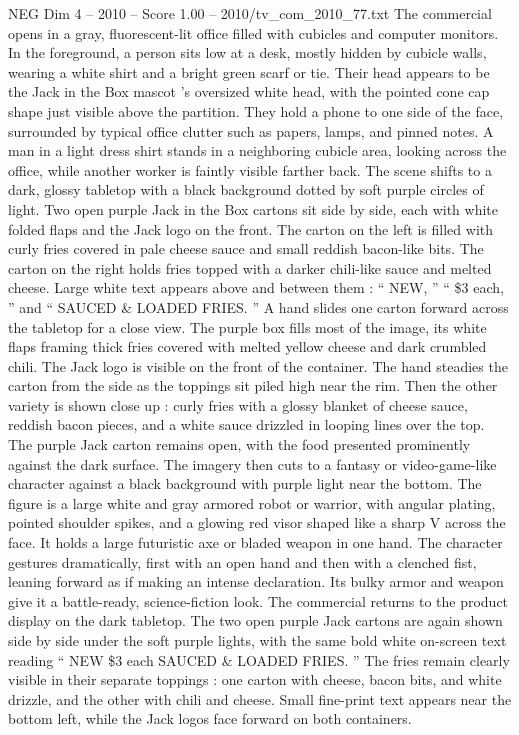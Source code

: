 \begin{textsample}{NEG Dim 4 – 2010 – Score 1.00 – 2010/tv\_com\_2010\_77.txt}  \label{ex:f4_neg_074}
The commercial opens in a gray, fluorescent-lit office filled with cubicles and computer monitors.
In the foreground, a person sits low at a desk, mostly hidden by cubicle walls, wearing a white shirt and a bright green scarf or tie.
Their head appears to be the Jack in the Box mascot ’s oversized white head, with the pointed cone cap shape just visible above the partition.
They hold a phone to one side of the face, surrounded by typical office clutter such as papers, lamps, and pinned notes.
A man in a light dress shirt stands in a neighboring cubicle area, looking across the office, while another worker is faintly visible farther back.
The scene shifts to a dark, glossy tabletop with a black background dotted by soft purple circles of light.
Two open purple Jack in the Box cartons sit side by side, each with white folded flaps and the Jack logo on the front.
The carton on the left is filled with curly fries covered in pale cheese sauce and small reddish bacon-like bits.
The carton on the right holds fries topped with a darker chili-like sauce and melted cheese.
Large white text appears above and between them : “ NEW, ” “ \$3 each, ” and “ SAUCED \& LOADED FRIES. ” A hand slides one carton forward across the tabletop for a close view.
The purple box fills most of the image, its white flaps framing thick fries covered with melted yellow cheese and dark crumbled chili.
The Jack logo is visible on the front of the container.
The hand steadies the carton from the side as the toppings sit piled high near the rim.
Then the other variety is shown close up : curly fries with a glossy blanket of cheese sauce, reddish bacon pieces, and a white sauce drizzled in looping lines over the top.
The purple Jack carton remains open, with the food presented prominently against the dark surface.
The imagery then cuts to a fantasy or video-game-like character against a black background with purple light near the bottom.
The figure is a large white and gray armored robot or warrior, with angular plating, pointed shoulder spikes, and a glowing red visor shaped like a sharp V across the face.
It holds a large futuristic axe or bladed weapon in one hand.
The character gestures dramatically, first with an open hand and then with a clenched fist, leaning forward as if making an intense declaration.
Its bulky armor and weapon give it a battle-ready, science-fiction look.
The commercial returns to the product display on the dark tabletop.
The two open purple Jack cartons are again shown side by side under the soft purple lights, with the same bold white on-screen text reading “ NEW \$3 each SAUCED \& LOADED FRIES. ” The fries remain clearly visible in their separate toppings : one carton with cheese, bacon bits, and white drizzle, and the other with chili and cheese.
Small fine-print text appears near the bottom left, while the Jack logos face forward on both containers.

\end{textsample}
